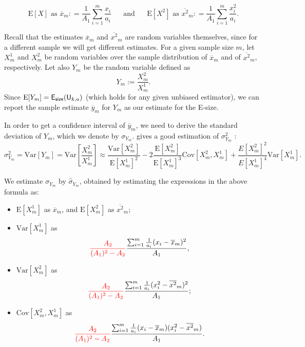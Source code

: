 \documentclass[a4paper,11pt]{article}
\newcommand{\kristoffer}[1]{{\color{red}{#1}}}
\newcommand{\U}{\mathsf{U}_{k,a}}
\newcommand{\esize}{{\sf E_{size}}}
\newcommand{\Var}{\text{Var}}
\newcommand{\Cov}{\text{Cov}}
\newcommand{\E}{\text{E}}
\begin{document}
\[\E[X] \text{ as } \overline{x}_m: = \frac{1}{A_1}{\sum_{i=1}^{m} \frac{x_i}{a_i}} \text{~~~~~and~~~~~} \E[X^2] \text{ as } \overline{x^2}_m: = \frac{1}{A_1}{\sum_{i=1}^{m} \frac{x_i^2}{a_i}}.\]

Recall that the estimates $\overline{x}_m$ and $\overline{x^2}_m$ are random variables themselves, since for a different sample we will get different estimates. For a given sample size $m$, let $X^1_{m}$ and $X^2_{m}$ be random variables over the sample distribution of $\overline{x}_m$ and of $\overline{x^2}_m$, respectively. Let also $Y_m$ be the random variable defined as 
\[Y_m := \frac{X^2_m}{X^1_m}.\]
Since $\E[Y_m] = \esize(\U)$ (which holds for any given unbiased estimator), we can report the sample estimate $\overline{y}_m$ for $Y_m$ as our estimate for the E-size. 

In order to get a confidence interval of $\overline{y}_m$, we need to derive the standard deviation of $Y_m$, which we denote by $\sigma_{Y_m}$. \kristoffer{If ... is ..., then the first order Taylor expansion} gives a good estimation of $\sigma_{Y_m}^2$ \cite{Benaroya:2005aa}:
\[\sigma_{Y_m}^2 = \Var\left[Y_m\right] = \Var\left[\frac{X^2_m}{X^1_m}\right] \approx \frac{\Var\left[X^2_m\right]}{\E\left[X^1_m\right]^2} -2\frac{\E\left[X^2_m\right]}{\E\left[X^1_m\right]^3}\Cov\left[X^2_m,X^1_m\right] + \frac{E\left[X^2_m\right]^2}{E\left[X^1_m\right]^4}\Var\left[X^1_m\right].\] 

We estimate $\sigma_{Y_m}$ by $\hat{\sigma}_{Y_m}$, obtained by estimating the expressions in the above formula as:
\begin{itemize}
\item $\E[X^1_m]$ as $\overline{x}_m$, and $\E[X^2_m]$ as $\overline{x^2}_m$;
\item $\Var[X^1_m]$ as 
\[\kristoffer{\frac{A_2}{(A_1)^2 - A_2}} \frac{\sum_{i = 1}^{m} \frac{1}{a_i}(x_i - \overline{x}_m)^2}{A_1},\]
\item $\Var[X^2_m]$ as 
\[\kristoffer{\frac{A_2}{(A_1)^2 - A_2}} \frac{\sum_{i = 1}^{m} \frac{1}{a_i}(x_i^2 - \overline{x^2}_m)^2}{A_1};\]
\item $\Cov[X^2_m,X^1_m]$ as 
\[\kristoffer{\frac{A_2}{(A_1)^2 - A_2}} \frac{\sum_{i=1}^{m} \frac{1}{a_i}(x_i - \overline{x}_m)(x_i^2 - \overline{x^2}_m)}{A_1}.\] 

\end{itemize}
\end{document}
